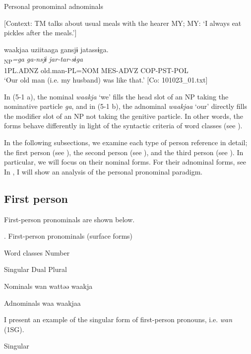  \ex \label{ex:5:1b} Personal pronominal adnominals

    [Context: TM talks about usual meals with the hearer MY; MY: ‘I always eat pickles after the meals.’]

\glll  waakjaa  uziitaaga  gansjɨ  jatassɨga.\\
[\textit{waakjaa}\textsubscript{Modifier}  \textit{uzii-taa}\textsubscript{Head}]\textsubscript{NP}\textit{=ga}  \textit{ga-nsjɨ}  \textit{jar-tar-sɨga}\\
1PL.ADNZ  old.man-PL=NOM  MES-ADVZ  COP-PST-POL\\
\glt ‘Our old man (i.e. my husband) was like that.’ [Co: 101023\_01.txt]
\z
\z

In (5-1 a), the nominal \textit{waakja} ‘we’ fills the head slot of an NP taking the nominative particle \textit{ga}, and in (5-1 b), the adnominal \textit{waakjaa} ‘our’ directly fills the modifier slot of an NP not taking the genitive particle. In other words, the forms behave differently in light of the syntactic criteria of word classes (see ).

  In the following subsections, we examine each type of person reference in detail; the first person (see ), the second person (see ), and the third person (see ). In particular, we will focus on their nominal forms. For their adnominal forms, see  In , I will show an analysis of the personal pronominal paradigm.

\subsection{First person}

First-person pronominals are shown below.

\begin{styleBeschriftung}
\textmd{. First-person pronominals (surface forms)}
\end{styleBeschriftung}

Word classes  Number

  Singular  Dual  Plural

Nominals  wan  wattəə  waakja

Adnominals  waa  waakjaa

I present an example of the singular form of first-person pronouns, i.e. \textit{wan} (1SG).

\ea \label{ex:5:2}   Singular

